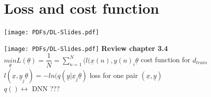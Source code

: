 \section{Loss and cost function}
\texttt{[image: PDFs/DL-Slides.pdf]}

\texttt{[image: PDFs/DL-Slides.pdf]}
\textbf{Review chapter 3.4}	\\
$ \underset{\underline{\theta}}{min}  L ( \underline{\theta  }) =  \dfrac{1}{N} = \sum_{n=1}^{N} (l(\underline{x}(n), y(n)_i \underline{\theta}$     cost function for $ d_{train } $ \\
$l(\underline{x}, \underline{y}_j \underline{\theta }) = - ln(q ( \underline{y} | \underline{x}_j \underline{\theta } )  $ loss for one pair $  (\underline{x}, \underline{y})  $ \\
$  q () \leftrightarrow $ DNN ???
